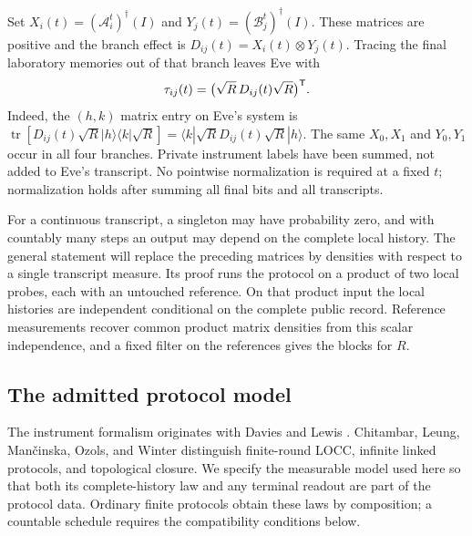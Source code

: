 Set $X_i(t)=(\mathcal A_i^t)^\dagger(I)$ and
$Y_j(t)=(\mathcal B_j^t)^\dagger(I)$.  These matrices are positive and the
branch effect is $D_{ij}(t)=X_i(t)\otimes Y_j(t)$.  Tracing the final
laboratory memories out of that branch leaves Eve with
\[
 \tau_{ij}(t)=\bigl(\sqrt R\,D_{ij}(t)\sqrt R\bigr)^\mathsf T.
\]
Indeed, the $(h,k)$ matrix entry on Eve's system is
$\operatorname{tr}[D_{ij}(t)\sqrt R|h\rangle\langle k|\sqrt R]
=\langle k|\sqrt R D_{ij}(t)\sqrt R|h\rangle$.
The same $X_0,X_1$ and $Y_0,Y_1$ occur in all four branches.  Private
instrument labels have been summed, not added to Eve's transcript.
No pointwise normalization is required at a fixed $t$; normalization holds
after summing all final bits and all transcripts.

For a continuous transcript, a singleton may have probability zero, and
with countably many steps an output may depend on the complete local
history.  The general statement will replace the preceding matrices by
densities with respect to a single transcript measure.  Its proof runs the
protocol on a product of two local probes, each with an untouched reference.
On that product input the local histories are independent conditional on
the complete public record.  Reference measurements recover common product
matrix densities from this scalar independence, and a fixed filter on the
references gives the blocks for $R$.

\subsection{The admitted protocol model}

The instrument formalism originates with Davies and Lewis
\cite{DaviesLewis1970}.  Chitambar, Leung, Man\v{c}inska, Ozols, and Winter
\cite{CLMOW2014} distinguish finite-round LOCC, infinite linked protocols,
and topological closure.  We specify the measurable model used here so that
both its complete-history law and any terminal readout are part of the
protocol data.  Ordinary finite protocols obtain these laws by composition;
a countable schedule requires the compatibility conditions below.

